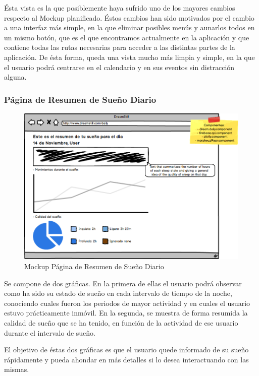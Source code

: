 \documentclass[11pt,openany]{book}
\begin{document}
Ésta vista es la que posiblemente haya sufrido uno de los mayores cambios respecto al Mockup planificado. Éstos cambios han sido motivados por el cambio a una interfaz más simple, en la que eliminar posibles menús y aunarlos todos en un mismo botón, que es el que encontramos actualmente en la aplicación y que contiene todas las rutas necesarias para acceder a las distintas partes de la aplicación. De ésta forma, queda una vista mucho más limpia y simple, en la que el usuario podrá centrarse en el calendario y en sus eventos sin distracción alguna.

\subsubsection{Página de Resumen de Sueño Diario}

\begin{figure}[H]
\centering
\includegraphics[totalheight=6.5cm]{mockups/DailyDreamPage.png}
\caption{Mockup Página de Resumen de Sueño Diario}
\end{figure}
\par\bigskip 
\noindent

Se compone de dos gráficas. En la primera de ellas el usuario podrá observar como ha sido su estado de sueño en cada intervalo de tiempo de la noche, conociendo cuales fueron los periodos de mayor actividad y en cuales el usuario estuvo prácticamente inmóvil. En la segunda, se muestra de forma resumida la calidad de sueño que se ha tenido, en función de la actividad de ese usuario durante el intervalo de sueño. 

El objetivo de éstas dos gráficas es que el usuario quede informado de su sueño rápidamente y pueda ahondar en más detalles si lo desea interactuando con las mismas.
\end{document}
